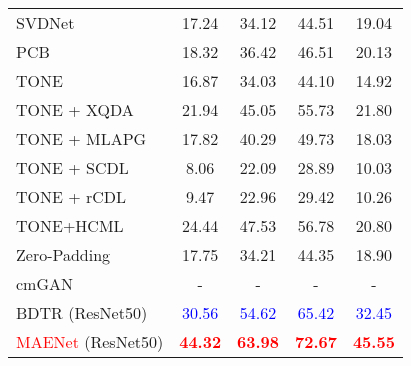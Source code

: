 \begin{table}[!htpb]
\begin{tabular}{cccccc}
  \hline
  \hline
  \multicolumn{2}{l|}{SVDNet\cite{sun2017svdnet}} &  17.24& 34.12 & 44.51 & 19.04  \\
  \multicolumn{2}{l|}{PCB\cite{sun2018beyond}} & 18.32& 36.42 & 46.51& 20.13   \\ 
  \hline
  \hline
  \multicolumn{2}{l|}{TONE\cite{ye2018hierarchical}} &  16.87& 34.03 & 44.10 & 14.92  \\
  \multicolumn{2}{l|}{TONE + XQDA} &  21.94 & 45.05 & 55.73 & 21.80  \\
  \multicolumn{2}{l|}{TONE + MLAPG} &  17.82 & 40.29 & 49.73 & 18.03  \\
  \multicolumn{2}{l|}{TONE + SCDL} &  8.06 & 22.09 & 28.89 & 10.03  \\
  \multicolumn{2}{l|}{TONE + rCDL} &  9.47 & 22.96 & 29.42 & 10.26  \\
  \multicolumn{2}{l|}{TONE+HCML }& 24.44 & 47.53 & 56.78 & 20.80 \\
  \multicolumn{2}{l|}{Zero-Padding\cite{wu2017rgb} }& 17.75 &34.21 & 44.35 & 18.90  \\
  \multicolumn{2}{l|}{cmGAN\cite{dai2018cross} }& - & - & - & -  \\
  \multicolumn{2}{l|}{BDTR (ResNet50)\cite{ye2018visible} }& \textcolor{blue}{30.56} & \textcolor{blue}{54.62} & \textcolor{blue}{65.42} & \textcolor{blue}{32.45}  \\
  \hline
  \hline
   \multicolumn{2}{l|}{\textcolor{red}{MAENet} (ResNet50) }&\textcolor{red}{\textbf{44.32}} & \textcolor{red}{\textbf{63.98}} & \textcolor{red}{\textbf{72.67}} & \textcolor{red}{\textbf{45.55}} \\
   \hline
   \hline
  \end{tabular}
  \label{table:visiblethermalRegdb}
\end{table}
